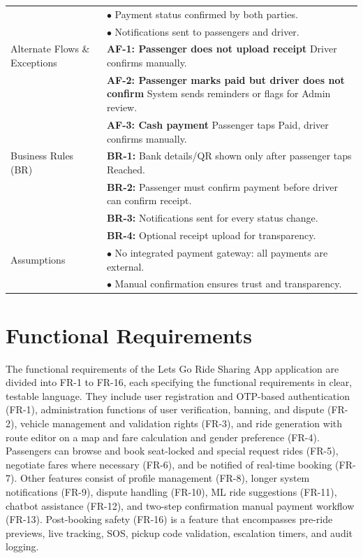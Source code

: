 \begin{longtable}{|>{\raggedright\arraybackslash}p{4cm}|>{\raggedright\arraybackslash}p{11cm}|}
& $\bullet$ Payment status confirmed by both parties. \\
& $\bullet$ Notifications sent to passengers and driver. \\
\hline
Alternate Flows \& Exceptions & \textbf{AF-1: Passenger does not upload receipt} \newline Driver confirms manually. \\
& \textbf{AF-2: Passenger marks paid but driver does not confirm} \newline System sends reminders or flags for Admin review. \\
& \textbf{AF-3: Cash payment} \newline Passenger taps Paid, driver confirms manually. \\
\hline
Business Rules (BR) & \textbf{BR-1:} Bank details/QR shown only after passenger taps Reached. \\
& \textbf{BR-2:} Passenger must confirm payment before driver can confirm receipt. \\
& \textbf{BR-3:} Notifications sent for every status change. \\
& \textbf{BR-4:} Optional receipt upload for transparency. \\
\hline
Assumptions & $\bullet$ No integrated payment gateway: all payments are external. \\
& $\bullet$ Manual confirmation ensures trust and transparency. \\
\hline
\end{longtable}

\section{Functional Requirements}

The functional requirements of the Lets Go Ride Sharing App application are divided into FR-1 to FR-16, each specifying the functional requirements in clear, testable language. They include user registration and OTP-based authentication (FR-1), administration functions of user verification, banning, and dispute (FR-2), vehicle management and validation rights (FR-3), and ride generation with route editor on a map and fare calculation and gender preference (FR-4). Passengers can browse and book seat-locked and special request rides (FR-5), negotiate fares where necessary (FR-6), and be notified of real-time booking (FR-7). Other features consist of profile management (FR-8), longer system notifications (FR-9), dispute handling (FR-10), ML ride suggestions (FR-11), chatbot assistance (FR-12), and two-step confirmation manual payment workflow (FR-13). Post-booking safety (FR-16) is a feature that encompasses pre-ride previews, live tracking, SOS, pickup code validation, escalation timers, and audit logging.

